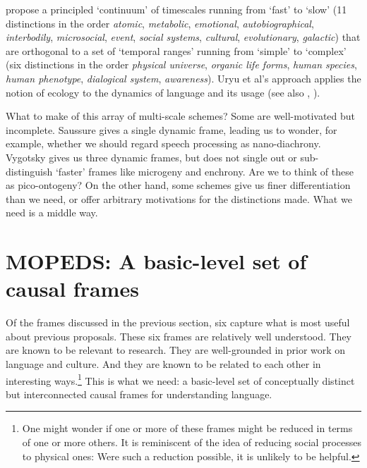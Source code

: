 \citet{uryu_ecology_2014} propose a principled \textquoteleft continuum' of timescales running from 
`fast' to \textquoteleft slow' (11 distinctions in the order \textit{atomic}, 
\textit{metabolic}, \textit{emotional}, \textit{autobiographical}, \textit{interbodily}, \textit{microsocial}, \textit{event}, 
\textit{social systems}, \textit{cultural}, \textit{evolutionary}, \textit{galactic}) that are orthogonal to a set of \textquoteleft temporal 
ranges' running from \textquoteleft simple' to \textquoteleft complex' (six distinctions in the 
order \textit{physical universe}, \textit{organic life forms}, 
\textit{human species}, \textit{human phenotype}, \textit{
dialogical system}, \textit{awareness}). Uryu et al's approach 
applies the notion of ecology to the dynamics of language and its usage (see also \citealt{cowley_distributed_2011}, \citealt{steffenson_ecolinguistics:_2013}).



What to make of this array of multi-scale schemes? Some are well-motivated but incomplete. Saussure gives 
a single dynamic frame, leading us to wonder, for example, whether we 
should regard speech processing as nano-diachrony. Vygotsky gives us three dynamic frames, but does not single out or 
sub-distinguish \textquoteleft faster' frames like microgeny and enchrony. Are we to 
think of these as pico-ontogeny? On the other hand, some schemes give us 
finer differentiation than we need, or offer arbitrary 
motivations for the distinctions made. What we need is a middle way. 



\section{MOPEDS: A basic-level set of causal frames}

Of the frames discussed in the previous section, six capture 
what is most useful about previous proposals. These six frames are relatively well understood. They are known to be 
relevant to research. They are well-grounded in prior work on language and 
culture. And they are known to be related to each other in interesting ways.\footnote{One might wonder if one or more of these frames might be reduced in terms of one or more others. It is reminiscent of the idea of reducing social processes to physical ones: Were such a reduction possible, it is unlikely to be helpful.} This is what we need: a basic-level set of conceptually 
distinct but interconnected causal frames for understanding language. 



